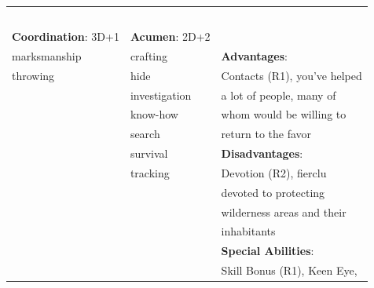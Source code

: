\documentclass[10pt]{article}
\begin{document}
\begin{table}
\begin{tabular}{m{156pt} m{156pt} m{156pt}}
 \hrulefill &  \hrulefill & \\

 \hrulefill &  \hrulefill & \\

 \hrulefill &  \hrulefill & \\

 \hrulefill &  \hrulefill & \\

 \hrulefill &  \hrulefill & \\


\textbf{Coordination}: 3D+1 \hrulefill & \textbf{Acumen}: 2D+2 \hrulefill     & \hrulefill \\

marksmanship         \hrulefill & crafting             \hrulefill & \textbf{Advantages}: \hrulefill \\

throwing             \hrulefill & hide                 \hrulefill & Contacts (R1), you've helped \hrulefill \\

 \hrulefill & investigation        \hrulefill & a lot of people, many of \hrulefill \\

 \hrulefill & know-how             \hrulefill & whom would be willing to \hrulefill \\

 \hrulefill & search               \hrulefill & return to the favor \hrulefill \\

 \hrulefill & survival             \hrulefill & \textbf{Disadvantages}: \hrulefill \\

 \hrulefill & tracking             \hrulefill & Devotion (R2), fierclu \hrulefill \\

 \hrulefill &  \hrulefill & devoted to protecting \hrulefill \\

 \hrulefill &  \hrulefill & wilderness areas and their \hrulefill \\

 \hrulefill &  \hrulefill & inhabitants \hrulefill \\

 \hrulefill &  \hrulefill & \textbf{Special Abilities}: \hrulefill \\

 \hrulefill &  \hrulefill & Skill Bonus (R1), Keen Eye, \hrulefill \\


\end{tabular}
\end{table}
\end{document}
